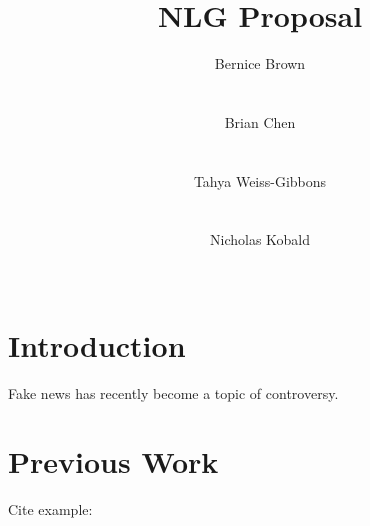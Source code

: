 \documentclass[11pt,a4paper]{article}
\title{NLG Proposal}
\author{Bernice Brown \\
						\\
						 \\\And
  Brian Chen \\
					 \\
					 \\\And
  Tahya Weiss-Gibbons \\
					  \\
					  \\\And
  Nicholas Kobald \\ \\
 }
\date{}
\begin{document}
\maketitle
\section{Introduction}

Fake news has recently become a topic of controversy.

\section{Previous Work} 

Cite example: \cite{augenstein2016stance}

%
%


\end{document}
